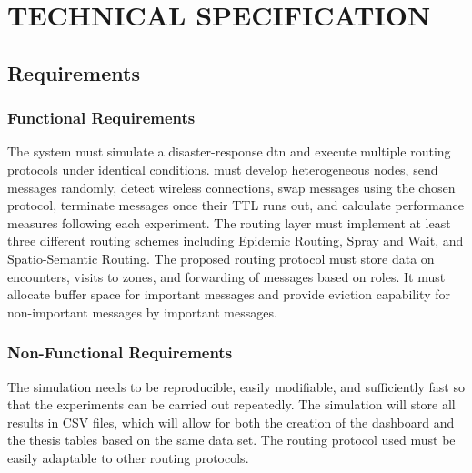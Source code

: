 \chapter{\MakeUppercase{Technical Specification}}

\section{Requirements}
\subsection{Functional Requirements}
The system must simulate a disaster-response \ac{dtn} and execute multiple routing protocols under identical conditions. must develop heterogeneous nodes, send messages randomly, detect wireless connections, swap messages using the chosen protocol, terminate messages once their TTL runs out, and calculate performance measures following each experiment.
The routing layer must implement at least three different routing schemes including Epidemic Routing, Spray and Wait, and Spatio-Semantic Routing. The proposed routing protocol must store data on encounters, visits to zones, and forwarding of messages based on roles. It must allocate buffer space for important messages and provide eviction capability for non-important messages by important messages.

\subsection{Non-Functional Requirements}
The simulation needs to be reproducible, easily modifiable, and sufficiently fast so that the experiments can be carried out repeatedly. The simulation will store all results in CSV files, which will allow for both the creation of the dashboard and the thesis tables based on the same data set. The routing protocol used must be easily adaptable to other routing protocols.
